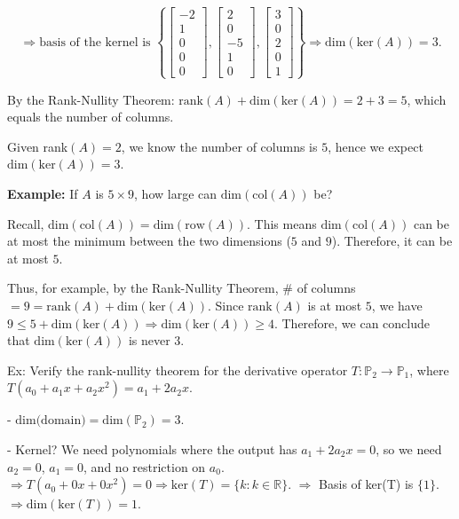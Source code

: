 \documentclass{article}
\begin{document}
\[\Rightarrow \text{basis of the kernel is } \left\{ \begin{bmatrix} -2 \\ 1 \\ 0 \\ 0 \\ 0 \end{bmatrix}, \begin{bmatrix} 2 \\ 0 \\ -5 \\ 1 \\ 0 \end{bmatrix}, \begin{bmatrix} 3 \\ 0 \\ 2 \\ 0 \\ 1 \end{bmatrix} \right\} \Rightarrow \text{dim}(\text{ker}(A)) = 3.\]

By the Rank-Nullity Theorem: $\text{rank}(A) + \text{dim}(\text{ker}(A)) = 2 + 3 = 5$, which equals the number of columns.


Given rank$(A) = 2$, we know the number of columns is $5$, hence we expect $\text{dim}(\text{ker}(A)) = 3$.


\textbf{Example:} If $A$ is $5\times 9$, how large can $\text{dim}(\text{col}(A))$ be?

Recall, $\text{dim}(\text{col}(A)) = \text{dim}(\text{row}(A))$. This means $\text{dim}(\text{col}(A))$ can be at most the minimum between the two dimensions ($5$ and $9$). Therefore, it can be at most $5$. 

Thus, for example, by the Rank-Nullity Theorem, $\#$ of columns $= 9 = \text{rank}(A) + \text{dim}(\text{ker}(A))$. Since $\text{rank}(A)$ is at most $5$, we have $9 \leq 5 + \text{dim}(\text{ker}(A)) \Rightarrow \text{dim}(\text{ker}(A)) \geq 4$. Therefore, we can conclude that $\text{dim}(\text{ker}(A))$ is never $3$.

Ex: Verify the rank-nullity theorem for the derivative operator $T: \mathbb{P}_2 \rightarrow \mathbb{P}_1$, where $T(a_0 + a_1x + a_2x^2) = a_1 + 2a_2x$. 

- $\text{dim(domain)} = \text{dim}(\mathbb{P}_2) = 3$. 

- Kernel? We need polynomials where the output has $a_1 + 2a_2x = 0$, so we need $a_2 = 0$, $a_1 = 0$, and no restriction on $a_0$. 
  $\Rightarrow T(a_0 + 0x + 0x^2) = 0 \Rightarrow \text{ker}(T) = \{ k : k \in \mathbb{R} \}$.
  $\Rightarrow$ Basis of ker(T) is $\{1\}$. $\Rightarrow \text{dim}(\text{ker}(T)) = 1$.
\end{document}

